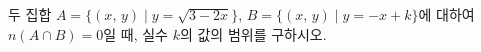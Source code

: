 \hspace*{2mm}\begin{minipage}[t]{\dimexpr\linewidth-2mm\relax}\vspace{0pt}
두 집합 $A=\{(x,\,y) \mid y=\sqrt{3-2x}\}$, $B=\{(x,\,y) \mid y=-x+k\}$에 대하여 $n(A\cap B)=0$일 때, 실수 $k$의 값의 범위를 구하시오.\end{minipage}
